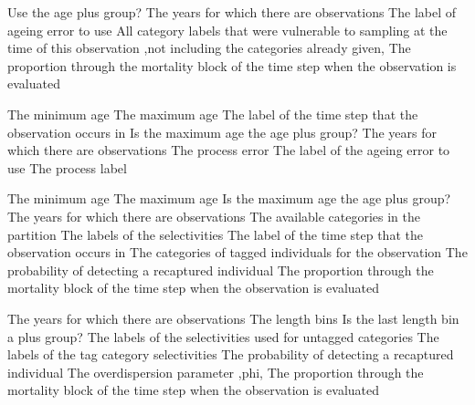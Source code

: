  {Use the age plus group?}
 {The years for which there are observations}
 {The label of ageing error to use}
 {All category labels that were vulnerable to sampling at the time of this observation ,not including the categories already given,}
 {The proportion through the mortality block of the time step when the observation is evaluated}
\par\textbf{}\par
{} {The minimum age}
 {The maximum age}
 {The label of the time step that the observation occurs in}
 {Is the maximum age the age plus group?}
 {The years for which there are observations}
 {The process error}
 {The label of the ageing error to use}
 {The process label}
\par\textbf{}\par
{} {The minimum age}
 {The maximum age}
 {Is the maximum age the age plus group?}
 {The years for which there are observations}
 {The available categories in the partition}
 {The labels of the selectivities}
 {The label of the time step that the observation occurs in}
 {The categories of tagged individuals for the observation}
 {The probability of detecting a recaptured individual}
 {The proportion through the mortality block of the time step when the observation is evaluated}
\par\textbf{}\par
{} {The years for which there are observations}
 {The length bins}
 {Is the last length bin a plus group?}
 {The labels of the selectivities used for untagged categories}
 {The labels of the tag category selectivities}
 {The probability of detecting a recaptured individual}
 {The overdispersion parameter ,phi,}
 {The proportion through the mortality block of the time step when the observation is evaluated}

